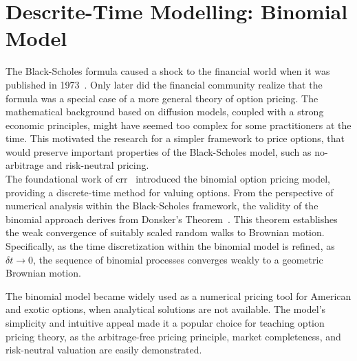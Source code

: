 
\section{Descrite-Time Modelling: Binomial Model}
    \label{sec:desc_time}

    The Black-Scholes formula caused a shock to the financial world when it
    was published in 1973~\cite{black_pricing_1973}. Only later did the
    financial community realize that the formula was a special case of a more general theory of option pricing.
    The mathematical background based on diffusion models, coupled with a strong economic principles,
    might have seemed too complex for some practitioners at the time.
    This motivated the research for a simpler framework to price options, that would preserve important
    properties of the Black-Scholes model, such as no-arbitrage and risk-neutral pricing. \\

    The foundational work of \gls{crr}~\cite{cox_option_1979} introduced the binomial option pricing model,
    providing a discrete-time method for valuing options.
    From the perspective of numerical analysis within the Black-Scholes framework,
    the validity of the binomial approach derives from Donsker's Theorem~\cite{billingsley_convergence_1999}.
    This theorem establishes the weak convergence of suitably scaled random walks to Brownian motion.
    Specifically, as the time discretization within the binomial model is refined, as $\delta t \to 0$,
    the sequence of binomial processes converges weakly to a geometric Brownian motion.

    The binomial model became widely used as a numerical pricing tool for American and exotic options,
    when analytical solutions are not available.
    The model's simplicity and intuitive appeal made it a popular choice for teaching option pricing theory,
    as the arbitrage-free pricing principle, market completeness, and risk-neutral valuation are easily demonstrated.

